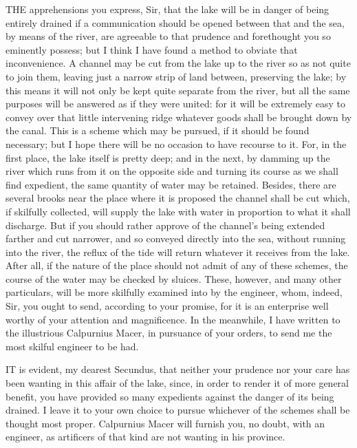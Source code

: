 
THE apprehensions you express, Sir, that the lake will be in danger of
being entirely drained if a communication should be opened between that
and the sea, by means of the river, are agreeable to that prudence and
forethought you so eminently possess; but I think I have found a method to
obviate that inconvenience. A channel may be cut from the lake up to the
river so as not quite to join them, leaving just a narrow strip of land
between, preserving the lake; by this means it will not only be kept quite
separate from the river, but all the same purposes will be answered as if
they were united: for it will be extremely easy to convey over that little
intervening ridge whatever goods shall be brought down by the canal. This
is a scheme which may be pursued, if it should be found necessary; but I
hope there will be no occasion to have recourse to it. For, in the first
place, the lake itself is pretty deep; and in the next, by damming up the
river which runs from it on the opposite side and turning its course as we
shall find expedient, the same quantity of water may be retained. Besides,
there are several brooks near the place where it is proposed the channel
shall be cut which, if skilfully collected, will supply the lake with
water in proportion to what it shall discharge. But if you should rather
approve of the channel's being extended farther and cut narrower, and so
conveyed directly into the sea, without running into the river, the reflux
of the tide will return whatever it receives from the lake. After all, if
the nature of the place should not admit of any of these schemes, the
course of the water may be checked by sluices. These, however, and many
other particulars, will be more skilfully examined into by the engineer,
whom, indeed, Sir, you ought to send, according to your promise, for it is
an enterprise well worthy of your attention and magnificence. In the
meanwhile, I have written to the illustrious Calpurnius Macer, in
pursuance of your orders, to send me the most skilful engineer to be had.


IT is evident, my dearest Secundus, that neither your prudence nor your
care has been wanting in this affair of the lake, since, in order to
render it of more general benefit, you have provided so many expedients
against the danger of its being drained. I leave it to your own choice to
pursue whichever of the schemes shall be thought most proper. Calpurnius
Macer will furnish you, no doubt, with an engineer, as artificers of that
kind are not wanting in his province.

